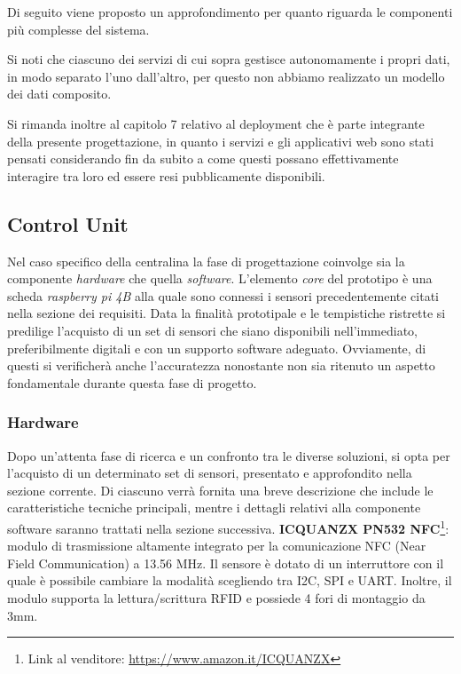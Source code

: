 Di seguito viene proposto un approfondimento per quanto riguarda le componenti più complesse del sistema.

Si noti che ciascuno dei servizi di cui sopra gestisce autonomamente i propri dati, in modo separato l'uno dall'altro, per questo non abbiamo realizzato un modello dei dati composito.

Si rimanda inoltre al capitolo 7 relativo al deployment che è parte integrante della presente progettazione,
in quanto i servizi e gli applicativi web sono stati pensati considerando fin da subito a come questi possano effettivamente 
interagire tra loro ed essere resi pubblicamente disponibili.

\subsection{Control Unit}
Nel caso specifico della centralina la fase di progettazione coinvolge sia la componente \textit{hardware} che quella \textit{software}. L'elemento \textit{core} del prototipo è una scheda \textit{raspberry pi 4B} alla quale sono connessi i sensori precedentemente citati nella sezione dei requisiti. Data la finalità prototipale e le tempistiche ristrette si predilige l'acquisto di un set di sensori che siano disponibili nell'immediato, preferibilmente digitali e con un supporto software adeguato. Ovviamente, di questi si verificherà anche l'accuratezza nonostante non sia ritenuto un aspetto fondamentale durante questa fase di progetto. 

\subsubsection{Hardware}
Dopo un'attenta fase di ricerca e un confronto tra le diverse soluzioni, si opta per l'acquisto di un determinato set di sensori, presentato e approfondito nella sezione corrente. Di ciascuno verrà fornita una breve descrizione che include le caratteristiche tecniche principali, mentre i dettagli relativi alla componente software saranno trattati nella sezione successiva.\newline\newline
%
\textbf{ICQUANZX PN532 NFC}\footnote{Link al venditore: \href{https://www.amazon.it/ICQUANZX-Communication-Arduino-Raspberry-Android/dp/B07VT431QZ/}{https://www.amazon.it/ICQUANZX}}: modulo di trasmissione altamente integrato per la comunicazione NFC (Near Field Communication) a 13.56 MHz. Il sensore è dotato di un interruttore con il quale è possibile cambiare la modalità scegliendo tra I2C, SPI e UART. Inoltre, il modulo supporta la lettura/scrittura RFID e possiede 4 fori di montaggio da 3mm. 
    
